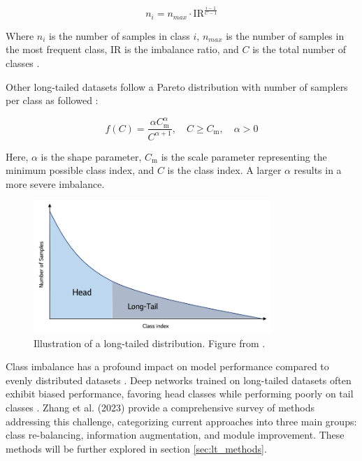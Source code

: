 \begin{equation}
    \label{eq:exp}
    n_i = n_{max}\cdot \text{IR}^{\frac{i-1}{C-1}}
\end{equation}

Where $n_i$ is the number of samples in class $i$, $n_{max}$ is the number of samples in the most frequent class, IR is the imbalance ratio, and $C$ is the total number of classes \cite{kaidic_ldam_drw}.

Other long-tailed datasets follow a Pareto distribution with number of samplers per class as followed \cite{liu2019largescalelongtailedrecognitionopen}:

\begin{equation}
    \label{eq:pareto}
    f(C) = \frac{\alpha C_{\text{m}}^\alpha}{C^{\alpha + 1}}, \quad C \geq C_{\text{m}}, \quad \alpha > 0
\end{equation}

Here, $\alpha$ is the shape parameter, $C_{\text{m}}$ is the scale parameter representing the minimum possible class index, and $C$ is the class index. A larger $\alpha$ results in a more severe imbalance.

    


\begin{figure}[ht]
    \centering
    \includegraphics[width=0.8\textwidth]{Images/long_tail_distribution.png} 
    \caption{Illustration of a long-tailed distribution. Figure from \cite{lgresearch257}.}
    \label{fig:lt_distribution} %
\end{figure}

Class imbalance has a profound impact on model performance compared to evenly distributed datasets \cite{vanhorn2017deviltailsfinegrainedclassification, cui2019classbalancedlossbasedeffective}. Deep networks trained on long-tailed datasets often exhibit biased performance, favoring head classes while performing poorly on tail classes \cite{zhang2023deep}. Zhang et al. (2023) provide a comprehensive survey of methods addressing this challenge, categorizing current approaches into three main groups: class re-balancing, information augmentation, and module improvement. These methods will be further explored in section \ref{sec:lt_methods}. 


